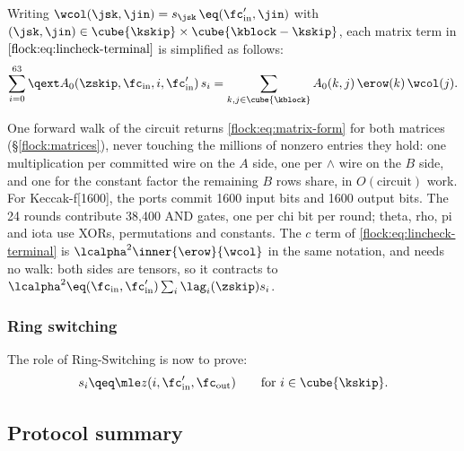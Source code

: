 Writing $\wcol(\jsk,\jin)=s_{\jsk}\,\eq(\fc'_{\mathrm{in}},\jin)$ with $(\jsk,\jin) \in\cube{\kskip} \times \cube{\kblock-\kskip}$, each matrix term in $\eqref{flock:eq:lincheck-terminal}$ is simplified as follows:
\begin{equation}\label{flock:eq:matrix-form}
\sum_{i=0}^{63}\qext A_0(\zskip,\fc_{\mathrm{in}},i,\fc'_{\mathrm{in}})\,s_i=\sum_{k,j\in\cube{\kblock}}A_0(k,j)\,\erow(k)\,\wcol(j).
\end{equation}

One forward walk of the circuit returns \eqref{flock:eq:matrix-form} for both matrices (\S\ref{flock:matrices}), never touching the millions of nonzero entries they hold: one multiplication per committed wire on the $A$ side, one per $\wedge$ wire on the $B$ side, and one for the constant factor the remaining $B$ rows share, in $O(\text{circuit})$ work. For Keccak-f[1600], the ports commit 1600 input bits and 1600 output bits. The 24 rounds contribute 38,400 AND gates, one per chi bit per round; theta, rho, pi and iota use XORs, permutations and constants. The $c$ term of \eqref{flock:eq:lincheck-terminal} is $\lcalpha^2\inner{\erow}{\wcol}$ in the same notation, and needs no walk: both sides are tensors, so it contracts to $\lcalpha^2\eq(\fc_{\mathrm{in}},\fc'_{\mathrm{in}})\sum_i\lag_i(\zskip)s_i$.

\subsubsection{Ring switching}\label{flock:ringswitch}

The role of Ring-Switching is now to prove:
\[
s_i \qeq \mle z(i,\fc'_{\mathrm{in}},\fc_{\mathrm{out}})\qquad\text{for }i\in\cube{\kskip}.
\]


\subsection{Protocol summary}\label{flock:summary}

